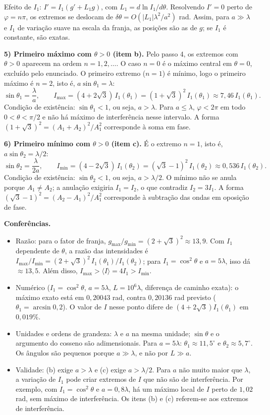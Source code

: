 \documentclass{article}%
\begin{document}
Efeito de $I_1$: $I'=I_1\left(g'+L_1g\right)$, com $L_1=d\ln I_1/d\theta$. Resolvendo $I'=0$ perto de $\varphi=n\pi$, os extremos se deslocam de $\delta\theta=O\!\left(|L_1|\lambda^2/a^2\right)$ rad. Assim, para $a\gg\lambda$ e $I_1$ de variação suave na escala da franja, as posições são as de $g$; se $I_1$ é constante, são exatas.

\textbf{5) Primeiro máximo com $\theta>0$ (item b).} Pelo passo 4, os extremos com $\theta>0$ aparecem na ordem $n=1,2,\dots$. O caso $n=0$ é o máximo central em $\theta=0$, excluído pelo enunciado. O primeiro extremo ($n=1$) é mínimo, logo o primeiro máximo é $n=2$, isto é, $a\sin\theta_1=\lambda$:
\[
\sin\theta_1=\frac{\lambda}{a},\qquad
I_{\max}=(4+2\sqrt{3})\,I_1(\theta_1)=(1+\sqrt{3})^2\,I_1(\theta_1)\approx 7{,}46\,I_1(\theta_1).
\]
Condição de existência: $\sin\theta_1<1$, ou seja, $a>\lambda$. Para $a\le\lambda$, $\varphi<2\pi$ em todo $0<\theta<\pi/2$ e não há máximo de interferência nesse intervalo. A forma $(1+\sqrt{3})^2=(A_1+A_2)^2/A_1^2$ corresponde à soma em fase.

\textbf{6) Primeiro mínimo com $\theta>0$ (item c).} É o extremo $n=1$, isto é, $a\sin\theta_2=\lambda/2$:
\[
\sin\theta_2=\frac{\lambda}{2a},\qquad
I_{\min}=(4-2\sqrt{3})\,I_1(\theta_2)=(\sqrt{3}-1)^2\,I_1(\theta_2)\approx 0{,}536\,I_1(\theta_2).
\]
Condição de existência: $\sin\theta_2<1$, ou seja, $a>\lambda/2$. O mínimo não se anula porque $A_1\neq A_2$; a anulação exigiria $I_1=I_2$, o que contradiz $I_2=3I_1$. A forma $(\sqrt{3}-1)^2=(A_2-A_1)^2/A_1^2$ corresponde à subtração das ondas em oposição de fase.

\textbf{Conferências.}
\begin{itemize}
\item Razão: para o fator de franja, $g_{\max}/g_{\min}=(2+\sqrt{3})^2\approx 13{,}9$. Com $I_1$ dependente de $\theta$, a razão das intensidades é $I_{\max}/I_{\min}=(2+\sqrt{3})^2\,I_1(\theta_1)/I_1(\theta_2)$; para $I_1=\cos^2\theta$ e $a=5\lambda$, isso dá $\approx 13{,}5$. Além disso, $I_{\max}>\langle I\rangle=4I_1>I_{\min}$.
\item Numérico ($I_1=\cos^2\theta$, $a=5\lambda$, $L=10^{6}\lambda$, diferença de caminho exata): o máximo exato está em $0{,}20043$ rad, contra $0{,}20136$ rad previsto ($\theta_1=\arcsin 0{,}2$). O valor de $I$ nesse ponto difere de $(4+2\sqrt{3})I_1(\theta_1)$ em $0{,}019\%$.
\item Unidades e ordens de grandeza: $\lambda$ e $a$ na mesma unidade; $\sin\theta$ e o argumento do cosseno são adimensionais. Para $a=5\lambda$: $\theta_1\approx 11{,}5^\circ$ e $\theta_2\approx 5{,}7^\circ$. Os ângulos são pequenos porque $a\gg\lambda$, e não por $L\gg a$.
\item Validade: (b) exige $a>\lambda$ e (c) exige $a>\lambda/2$. Para $a$ não muito maior que $\lambda$, a variação de $I_1$ pode criar extremos de $I$ que não são de interferência. Por exemplo, com $I_1=\cos^2\theta$ e $a=0{,}8\lambda$, há um máximo local de $I$ perto de $1{,}02$ rad, sem máximo de interferência. Os itens (b) e (c) referem-se aos extremos de interferência.
\end{itemize}
\end{document}
